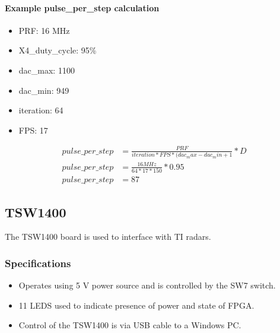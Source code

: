 \documentclass[letterpaper,10pt,english]{sphinxmanual}
\begin{document}
\paragraph{Example pulse\_per\_step calculation}
\label{\detokenize{radar information:example-pulse-per-step-calculation}}\begin{itemize}
\item {} 
PRF: 16 MHz

\item {} 
X4\_duty\_cycle: 95\%

\item {} 
dac\_max: 1100

\item {} 
dac\_min: 949

\item {} 
iteration: 64

\item {} 
FPS: 17

\end{itemize}
\begin{equation*}
\begin{split}pulse\_per\_step &= \frac{PRF}{iteration*FPS*(dac_max-dac_min+1} * D \\
pulse\_per\_step  &= \frac{16 MHz}{64*17*150} * 0.95 \\
pulse\_per\_step  &= 87\end{split}
\end{equation*}

\subsection{TSW1400}
\label{\detokenize{radar information:tsw1400}}
The TSW1400 board is used to interface with TI radars.


\subsubsection{Specifications}
\label{\detokenize{radar information:id1}}\begin{itemize}
\item {} 
Operates using 5 V power source and is controlled by the SW7 switch.

\item {} 
11 LEDS used to indicate presence of power and state of FPGA.

\item {} 
Control of the TSW1400 is via USB cable to a Windows PC.

\end{itemize}
\end{document}
